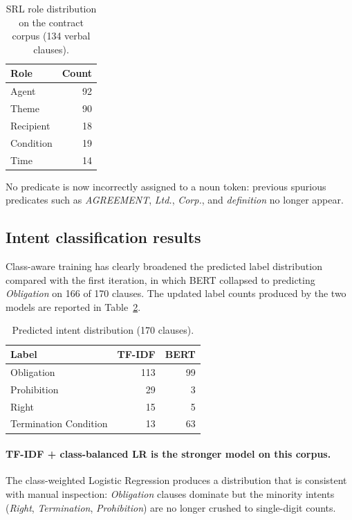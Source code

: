 \documentclass[assignment.tex]{subfiles}
\begin{document}
\begin{table}[H]
    \centering
    \caption{SRL role distribution on the contract corpus (134 verbal clauses).}
    \label{tab:srl-results}
    \begin{tabular}{@{}lr@{}}
        \toprule
        \textbf{Role} & \textbf{Count} \\
        \midrule
        Agent     & 92 \\
        Theme     & 90 \\
        Recipient & 18 \\
        Condition & 19 \\
        Time      & 14 \\
        \bottomrule
    \end{tabular}
\end{table}

No predicate is now incorrectly assigned to a noun token: previous spurious
predicates such as \textit{AGREEMENT}, \textit{Ltd.}, \textit{Corp.}, and
\textit{definition} no longer appear.

\subsection{Intent classification results}

Class-aware training has clearly broadened the predicted label distribution
compared with the first iteration, in which BERT collapsed to predicting
\emph{Obligation} on 166 of 170 clauses.  The updated label counts produced
by the two models are reported in Table~\ref{tab:intent-results}.

\begin{table}[H]
    \centering
    \caption{Predicted intent distribution (170 clauses).}
    \label{tab:intent-results}
    \begin{tabular}{@{}lrr@{}}
        \toprule
        \textbf{Label} & \textbf{TF-IDF} & \textbf{BERT} \\
        \midrule
        Obligation             & 113 &  99 \\
        Prohibition            &  29 &   3 \\
        Right                  &  15 &   5 \\
        Termination Condition  &  13 &  63 \\
        \bottomrule
    \end{tabular}
\end{table}

\paragraph{TF-IDF + class-balanced LR is the stronger model on this corpus.}
The class-weighted Logistic Regression produces a distribution that is
consistent with manual inspection: \emph{Obligation} clauses dominate but the
minority intents (\emph{Right}, \emph{Termination}, \emph{Prohibition}) are
no longer crushed to single-digit counts.
\end{document}
